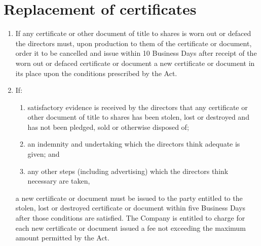 \section{Replacement of certificates}

\begin{enumerate}[label=(\alph*)]
    \item If any certificate or other document of title to shares is worn out or defaced the directors must, upon production to them of the certificate or document, order it to be cancelled and issue within 10 Business Days after receipt of the worn out or defaced certificate or document a new certificate or document in its place upon the conditions prescribed by the Act.
    
    \item If:
    \begin{enumerate}[label=(\roman*)]
        \item satisfactory evidence is received by the directors that any certificate or other document of title to shares has been stolen, lost or destroyed and has not been pledged, sold or otherwise disposed of;
        \item an indemnity and undertaking which the directors think adequate is given; and
        \item any other steps (including advertising) which the directors think necessary are taken,
    \end{enumerate}
    
    a new certificate or document must be issued to the party entitled to the stolen, lost or destroyed certificate or document within five Business Days after those conditions are satisfied. The Company is entitled to charge for each new certificate or document issued a fee not exceeding the maximum amount permitted by the Act.
\end{enumerate} 